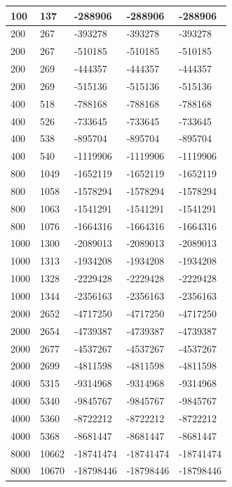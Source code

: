 \begin{longtable}[H]{|p{1.5cm}|p{1.5cm}|p{2cm}|p{3cm}|p{4cm}|}
    100 & 137 & -288906 & -288906 & -288906 \\ \hline
    200 & 267 & -393278 & -393278 & -393278 \\ \hline
    200 & 267 & -510185 & -510185 & -510185 \\ \hline
    200 & 269 & -444357 & -444357 & -444357 \\ \hline
    200 & 269 & -515136 & -515136 & -515136 \\ \hline
    400 & 518 & -788168 & -788168 & -788168 \\ \hline
    400 & 526 & -733645 & -733645 & -733645 \\ \hline
    400 & 538 & -895704 & -895704 & -895704 \\ \hline
    400 & 540 & -1119906 & -1119906 & -1119906 \\ \hline
    800 & 1049 & -1652119 & -1652119 & -1652119 \\ \hline 
    800 & 1058 & -1578294 & -1578294 & -1578294 \\ \hline 
    800 & 1063 & -1541291 & -1541291 & -1541291 \\ \hline
    800 & 1076 & -1664316 & -1664316 & -1664316 \\ \hline
    1000 & 1300 & -2089013 & -2089013 & -2089013 \\ \hline
    1000 & 1313 & -1934208 & -1934208 & -1934208 \\ \hline
    1000 & 1328 & -2229428 & -2229428 & -2229428 \\ \hline
    1000 & 1344 & -2356163 & -2356163 & -2356163 \\ \hline
    2000 & 2652 & -4717250 & -4717250 & -4717250 \\ \hline
    2000 & 2654 & -4739387 & -4739387 & -4739387 \\ \hline 
    2000 & 2677 & -4537267 & -4537267 & -4537267 \\ \hline 
    2000 & 2699 & -4811598 & -4811598 & -4811598 \\ \hline 
    4000 & 5315 & -9314968 & -9314968 & -9314968 \\ \hline
    4000 & 5340 & -9845767 & -9845767 & -9845767 \\ \hline
    4000 & 5360 & -8722212 & -8722212 & -8722212 \\ \hline
    4000 & 5368 & -8681447 & -8681447 & -8681447 \\ \hline 
    8000 & 10662 & -18741474 & -18741474 & -18741474 \\ \hline  
    8000 & 10670 & -18798446 & -18798446 & -18798446 \\ \hline  

\end{longtable}
